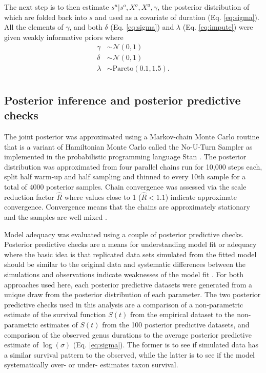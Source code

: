 \documentclass{article}
\begin{document}
The next step is to then estimate \(s^{u} | s^{o}, X^{o}, X^{u}, \gamma\), the posterior distribution of which are folded back into \(s\) and used as a covariate of duration (Eq. \ref{eq:sigma}). All the elements of \(\gamma\), and both \(\delta\) (Eq. \ref{eq:sigma}) and \(\lambda\) (Eq. \ref{eq:impute}) were given weakly informative priors where
\begin{equation}
  \begin{aligned}
    \gamma &\sim \mathcal{N}(0, 1) \\
    \delta &\sim \mathcal{N}(0, 1) \\
    \lambda &\sim \mathrm{Pareto}(0.1, 1.5). \\
  \end{aligned}
\end{equation}


\subsection{Posterior inference and posterior predictive checks}
The joint posterior was approximated using a Markov-chain Monte Carlo routine that is a variant of Hamiltonian Monte Carlo called the No-U-Turn Sampler \citep{Hoffman2014} as implemented in the probabilistic programming language Stan \citep{2014stan}. The posterior distribution was approximated from four parallel chains run for 10,000 steps each, split half warm-up and half sampling and thinned to every 10th sample for a total of 4000 posterior samples. Chain convergence was assessed via the scale reduction factor \(\hat{R}\) where values close to 1 (\(\hat{R} < 1.1\)) indicate approximate convergence. Convergence means that the chains are approximately stationary and the samples are well mixed \citep{Gelman2013d}.

Model adequacy was evaluated using a couple of posterior predictive checks. Posterior predictive checks are a means for understanding model fit or adequacy where the basic idea is that replicated data sets simulated from the fitted model should be similar to the original data and systematic differences between the simulations and observations indicate weaknesses of the model fit \citep{Gelman2013d}. For both approaches used here, each posterior predictive datasets were generated from a unique draw from the posterior distribution of each parameter. The two posterior predictive checks used in this analysis are a comparison of a non-parametric estimate of the survival function \(S(t)\) from the empirical dataset to the non-parametric estimates of \(S(t)\) from the 100 posterior predictive datasets, and comparison of the observed genus durations to the average posterior predictive estimate of \(\log(\sigma)\) (Eq. \ref{eq:sigma}). The former is to see if simulated data has a similar survival pattern to the observed, while the latter is to see if the model systematically over- or under- estimates taxon survival.
\end{document}
